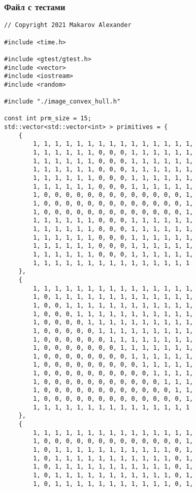 \documentclass{report}
\begin{document}
\subsubsection{Файл с тестами}
\begin{lstlisting}
// Copyright 2021 Makarov Alexander

#include <time.h>

#include <gtest/gtest.h>
#include <vector>
#include <iostream>
#include <random>

#include "./image_convex_hull.h"

const int prm_size = 15;
std::vector<std::vector<int> > primitives = {
    {
        1, 1, 1, 1, 1, 1, 1, 1, 1, 1, 1, 1, 1, 1, 1,
        1, 1, 1, 1, 1, 1, 0, 0, 0, 1, 1, 1, 1, 1, 1,
        1, 1, 1, 1, 1, 1, 0, 0, 0, 1, 1, 1, 1, 1, 1,
        1, 1, 1, 1, 1, 1, 0, 0, 0, 1, 1, 1, 1, 1, 1,
        1, 1, 1, 1, 1, 1, 0, 0, 0, 1, 1, 1, 1, 1, 1,
        1, 1, 1, 1, 1, 1, 0, 0, 0, 1, 1, 1, 1, 1, 1,
        1, 0, 0, 0, 0, 0, 0, 0, 0, 0, 0, 0, 0, 0, 1,
        1, 0, 0, 0, 0, 0, 0, 0, 0, 0, 0, 0, 0, 0, 1,
        1, 0, 0, 0, 0, 0, 0, 0, 0, 0, 0, 0, 0, 0, 1,
        1, 1, 1, 1, 1, 1, 0, 0, 0, 1, 1, 1, 1, 1, 1,
        1, 1, 1, 1, 1, 1, 0, 0, 0, 1, 1, 1, 1, 1, 1,
        1, 1, 1, 1, 1, 1, 0, 0, 0, 1, 1, 1, 1, 1, 1,
        1, 1, 1, 1, 1, 1, 0, 0, 0, 1, 1, 1, 1, 1, 1,
        1, 1, 1, 1, 1, 1, 0, 0, 0, 1, 1, 1, 1, 1, 1,
        1, 1, 1, 1, 1, 1, 1, 1, 1, 1, 1, 1, 1, 1, 1
    },
    {
        1, 1, 1, 1, 1, 1, 1, 1, 1, 1, 1, 1, 1, 1, 1,
        1, 0, 1, 1, 1, 1, 1, 1, 1, 1, 1, 1, 1, 1, 1,
        1, 0, 0, 1, 1, 1, 1, 1, 1, 1, 1, 1, 1, 1, 1,
        1, 0, 0, 0, 1, 1, 1, 1, 1, 1, 1, 1, 1, 1, 1,
        1, 0, 0, 0, 0, 1, 1, 1, 1, 1, 1, 1, 1, 1, 1,
        1, 0, 0, 0, 0, 0, 1, 1, 1, 1, 1, 1, 1, 1, 1,
        1, 0, 0, 0, 0, 0, 0, 1, 1, 1, 1, 1, 1, 1, 1,
        1, 0, 0, 0, 0, 0, 0, 0, 1, 1, 1, 1, 1, 1, 1,
        1, 0, 0, 0, 0, 0, 0, 0, 0, 1, 1, 1, 1, 1, 1,
        1, 0, 0, 0, 0, 0, 0, 0, 0, 0, 1, 1, 1, 1, 1,
        1, 0, 0, 0, 0, 0, 0, 0, 0, 0, 0, 1, 1, 1, 1,
        1, 0, 0, 0, 0, 0, 0, 0, 0, 0, 0, 0, 1, 1, 1,
        1, 0, 0, 0, 0, 0, 0, 0, 0, 0, 0, 0, 0, 1, 1,
        1, 0, 0, 0, 0, 0, 0, 0, 0, 0, 0, 0, 0, 0, 1,
        1, 1, 1, 1, 1, 1, 1, 1, 1, 1, 1, 1, 1, 1, 1
    },
    {
        1, 1, 1, 1, 1, 1, 1, 1, 1, 1, 1, 1, 1, 1, 1,
        1, 0, 0, 0, 0, 0, 0, 0, 0, 0, 0, 0, 0, 0, 1,
        1, 0, 1, 1, 1, 1, 1, 1, 1, 1, 1, 1, 1, 0, 1,
        1, 0, 1, 1, 1, 1, 1, 1, 1, 1, 1, 1, 1, 0, 1,
        1, 0, 1, 1, 1, 1, 1, 1, 1, 1, 1, 1, 1, 0, 1,
        1, 0, 1, 1, 1, 1, 1, 1, 1, 1, 1, 1, 1, 0, 1,
        1, 0, 1, 1, 1, 1, 1, 1, 1, 1, 1, 1, 1, 0, 1,

\end{lstlisting}
\end{document}
